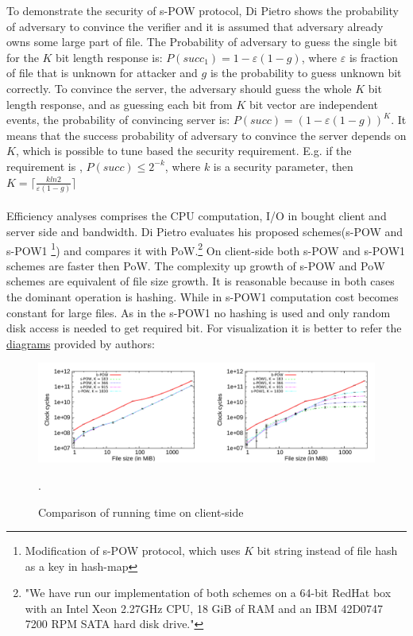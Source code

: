 \documentclass[12pt]{article}
\begin{document}
To demonstrate the security of s-POW protocol, Di Pietro shows the probability of adversary to convince the verifier and it is assumed that adversary already owns some large part of file. The Probability of adversary to guess the single bit for the $K$ bit length response is: $P(succ_1) = 1-\varepsilon(1-g)$, where $\varepsilon$ is fraction of file that is unknown for attacker and $g$ is the probability to guess unknown bit correctly. To convince the server, the adversary should guess the whole $K$ bit length response, and as guessing each bit from $K$ bit vector are independent events, the probability of convincing server is: $P(succ) = (1-\varepsilon(1-g))^K$. It means that the success probability  of adversary to convince the server depends on $K$, which is possible to tune based the security requirement. E.g. if the requirement is , $P(succ)\leq2^{-k}$, where $k$ is a security parameter, then $K =\lceil \frac{k ln 2}{\varepsilon(1-g)} \rceil $\\\\
Efficiency analyses comprises  the CPU computation, I/O  in bought client and server side and bandwidth. Di Pietro evaluates his proposed schemes(s-POW and s-POW1 \footnote{Modification of s-POW protocol, which uses $K$ bit string  instead of file hash as a key in hash-map}) and compares it with PoW.\footnote{"We have run our implementation of both schemes on a 64-bit RedHat box with an Intel Xeon 2.27GHz CPU, 18 GiB of RAM and an IBM 42D0747 7200 RPM SATA hard disk drive."}\cite{PoW} On client-side both s-POW and s-POW1 schemes are faster then PoW. The complexity up growth of s-POW and PoW schemes are equivalent of file size growth. It is reasonable because in both cases the dominant operation is hashing. While in s-POW1 computation cost becomes  constant for large files. As in the s-POW1 no hashing is used and only random disk access is needed to get required bit. For  visualization it is better to refer  the \hyperref[fig:POWvsPoW]{diagrams} provided by authors:
\begin{figure}[ht] 
\begin{center}
\includegraphics[width=1.0\textwidth]{POWvsPoW}
\caption{Comparison of running time on client-side}
\label{fig:POWvsPoW} .
\end{center}
\end{figure}
\end{document}

